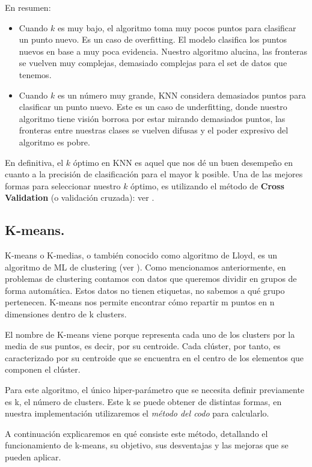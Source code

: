 \documentclass[12pt,a4paper]{article}
\begin{document}
\begin{sloppypar}
En resumen:
\begin{itemize}
\item Cuando $k$ es muy bajo, el algoritmo toma muy pocos puntos para clasificar un punto nuevo. Es un caso de overfitting. El modelo clasifica los puntos nuevos en base a muy poca evidencia. Nuestro algoritmo alucina, las fronteras se vuelven muy complejas, demasiado complejas para el set de datos que tenemos. 
\item Cuando $k$ es un número muy grande, KNN considera demasiados puntos para clasificar un punto nuevo. Este es un caso de underfitting, donde nuestro algoritmo tiene visión borrosa por estar mirando demasiados puntos, las fronteras entre nuestras clases se vuelven difusas y el poder expresivo del algoritmo es pobre. 
\end{itemize}

En definitiva, el $k$ óptimo en KNN es aquel que nos dé un buen desempeño en cuanto a la precisión de clasificación para el mayor k posible. Una de las mejores formas para seleccionar nuestro $k$ óptimo, es utilizando el método de \textbf{Cross Validation} (o validación cruzada): ver \textit{}.

\cleardoublepage
\subsection{K-means.}\label{k_means_3_4}
K-means o K-medias, o también conocido como algoritmo de Lloyd, es un algoritmo de ML de clustering (ver \textit{}). Como mencionamos anteriormente, en problemas de clustering contamos con datos que queremos dividir en grupos de forma automática. Estos datos no tienen etiquetas, no sabemos a qué grupo pertenecen. K-means nos permite encontrar cómo repartir m puntos en n dimensiones dentro de k clusters.

El nombre de K-means viene porque representa cada uno de los clusters por la media de sus puntos, es decir, por su centroide. Cada clúster, por tanto, es caracterizado por su centroide que se encuentra en el centro de los elementos que componen el clúster.

Para este algoritmo, el único hiper-parámetro que se necesita definir previamente es k, el número de clusters. Este k se puede obtener de distintas formas, en nuestra implementación utilizaremos el \textit{método del codo} para calcularlo. 

A continuación explicaremos en qué consiste este método, detallando el funcionamiento de k-means, su objetivo, sus desventajas y las mejoras que se pueden aplicar.


\end{sloppypar}
\end{document}
